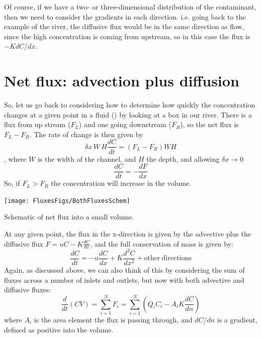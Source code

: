 Of course, if we have a two- or three-dimensional distribution of the contaminant, then we need to consider the gradients in each direction.  i.e. going back to the example of the river, the diffusive flux would be in the same direction as flow, since the high concentration is coming from upstream, so in this case the flux is $-K dC/dx$.  

\section{Net flux: advection plus diffusion}

So, let us go back to considering how to determine how quickly the concentration changes at a given point in a fluid () by looking at a box in our river.  There is a flux from up stream ($F_L$) and one going downstream ($F_R$), so the net flux is $F_L - F_R$.  The rate of change is then given by 
\begin{equation}
    \delta x\, W\, H  \frac{d C}{d t} = \left(F_L - F_R\right) W H
\end{equation}, where $W$ is the width of the channel, and $H$ the depth, and 
 allowing $\delta x \to 0$
\begin{equation}
 \frac{d C}{d t} = -\frac{d F}{d x}
\end{equation}
So, if $F_L>F_R$ the concentration will increase in the volume.  

\begin{marginfigure}
  \begin{center}
    \texttt{[image: FluxesFigs/BothFluxesSchem]}
    \caption{Schematic of net flux into a small volume.}
    \label{fig:BothFluxesSchem}  
  \end{center}
\end{marginfigure}

At any given point, the flux in the x-direction is given by the advective plus the diffusive flux $F = uC - K \frac{dC}{dx}$, and the full conservation of mass is given by:
\begin{equation}
    \label{massboth}
    \frac{dC}{dt} = -u \frac{dC}{dx} + K \frac{d^2C}{dx^2} + \mathrm{other\ directions}
\end{equation}
Again, as discussed above, we can also think of this by considering the sum of fluxes across a number of inlets and outlets, but now with both advective and diffusive fluxes:
\begin{equation}
    \label{eq:sumMassConBoth}
    \frac{d}{dt}\left(C V\right) = \sum_{i=1}^N F_i = \sum_{i=1}^N \left( Q_i C_i - A_i K \frac{dC}{dn}\right)
\end{equation}
where $A_i$ is the area element the flux is passing through, and $dC/dn$ is a gradient, defined as positive into the volume.  

